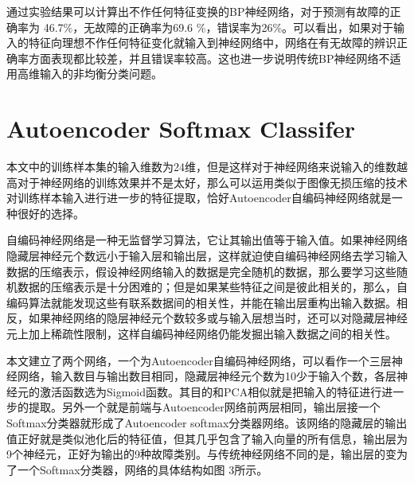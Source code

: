 \documentclass{ctacn}%
\begin{document}
\begin{multicols}{2}
通过实验结果可以计算出不作任何特征变换的BP神经网络，对于预测有故障的正确率为
46.7\%，无故障的正确率为69.6
\%，错误率为26\%。可以看出，如果对于输入的特征向理想不作任何特征变化就输入到神经网络中，网络在有无故障的辨识正确率方面表现都比较差，并且错误率较高。这也进一步说明传统BP神经网络不适用高维输入的非均衡分类问题。

\section{Autoencoder Softmax Classifer}

本文中的训练样本集的输入维数为24维，但是这样对于神经网络来说输入的维数越高对于神经网络的训练效果并不是太好，那么可以运用类似于图像无损压缩的技术对训练样本输入进行进一步的特征提取，恰好Autoencoder自编码神经网络就是一种很好的选择。

自编码神经网络是一种无监督学习算法，它让其输出值等于输入值。如果神经网络隐藏层神经元个数远小于输入层和输出层，这样就迫使自编码神经网络去学习输入数据的压缩表示，假设神经网络输入的数据是完全随机的数据，那么要学习这些随机数据的压缩表示是十分困难的；但是如果某些特征之间是彼此相关的，那么，自编码算法就能发现这些有联系数据间的相关性，并能在输出层重构出输入数据。相反，如果神经网络的隐层神经元个数较多或与输入层想当时，还可以对隐藏层神经元上加上稀疏性限制，这样自编码神经网络仍能发掘出输入数据之间的相关性。

本文建立了两个网络，一个为Autoencoder自编码神经网络，可以看作一个三层神经网络，输入数目与输出数目相同，隐藏层神经元个数为10少于输入个数，各层神经元的激活函数选为Sigmoid函数。其目的和PCA相似就是把输入的特征进行进一步的提取。另外一个就是前端与Autoencoder网络前两层相同，输出层接一个Softmax分类器就形成了Autoencoder
softmax分类器网络。该网络的隐藏层的输出值正好就是类似池化后的特征值，但其几乎包含了输入向量的所有信息，输出层为9个神经元，正好为输出的9种故障类别。与传统神经网络不同的是，输出层的变为了一个Softmax分类器，网络的具体结构如图
3所示。


\end{multicols}
\end{document}

